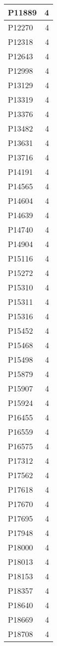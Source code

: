 \documentclass[
]{book}
\theoremstyle{definition}
\theoremstyle{definition}
\theoremstyle{definition}
\theoremstyle{definition}
\theoremstyle{remark}
\begin{document}
\begin{table}
\begin{tabular}{l|r}
\hline
P11889 & 4\\
\hline
P12270 & 4\\
\hline
P12318 & 4\\
\hline
P12643 & 4\\
\hline
P12998 & 4\\
\hline
P13129 & 4\\
\hline
P13319 & 4\\
\hline
P13376 & 4\\
\hline
P13482 & 4\\
\hline
P13631 & 4\\
\hline
P13716 & 4\\
\hline
P14191 & 4\\
\hline
P14565 & 4\\
\hline
P14604 & 4\\
\hline
P14639 & 4\\
\hline
P14740 & 4\\
\hline
P14904 & 4\\
\hline
P15116 & 4\\
\hline
P15272 & 4\\
\hline
P15310 & 4\\
\hline
P15311 & 4\\
\hline
P15316 & 4\\
\hline
P15452 & 4\\
\hline
P15468 & 4\\
\hline
P15498 & 4\\
\hline
P15879 & 4\\
\hline
P15907 & 4\\
\hline
P15924 & 4\\
\hline
P16455 & 4\\
\hline
P16559 & 4\\
\hline
P16575 & 4\\
\hline
P17312 & 4\\
\hline
P17562 & 4\\
\hline
P17618 & 4\\
\hline
P17670 & 4\\
\hline
P17695 & 4\\
\hline
P17948 & 4\\
\hline
P18000 & 4\\
\hline
P18013 & 4\\
\hline
P18153 & 4\\
\hline
P18357 & 4\\
\hline
P18640 & 4\\
\hline
P18669 & 4\\
\hline
P18708 & 4\\

\end{tabular}
\end{table}
\end{document}
